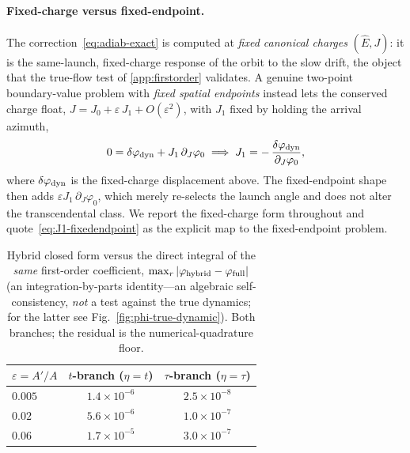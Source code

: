 \documentclass[12pt]{iopart}
\newcommand{\Ehat}{\hat E}
\begin{document}
\paragraph{Fixed-charge versus fixed-endpoint.} The correction~\eqref{eq:adiab-exact}
is computed at \emph{fixed canonical charges} $(\Ehat,J)$: it is the same-launch,
fixed-charge response of the orbit to the slow drift, the object that the true-flow
test of \ref{app:firstorder} validates. A genuine two-point boundary-value
problem with \emph{fixed spatial endpoints} instead lets the conserved charge float,
$J=J_0+\varepsilon\,J_1+O(\varepsilon^2)$, with $J_1$ fixed by holding the arrival
azimuth,
\begin{equation}
    0=\delta\varphi_{\rm dyn}+J_1\,\partial_J\varphi_0
    \;\Longrightarrow\;
    J_1=-\,\frac{\delta\varphi_{\rm dyn}}{\partial_J\varphi_0},
    \label{eq:J1-fixedendpoint}
\end{equation}
where $\delta\varphi_{\rm dyn}$ is the fixed-charge displacement above. The
fixed-endpoint shape then adds $\varepsilon J_1\,\partial_J\varphi_0$, which merely
re-selects the launch angle and does not alter the transcendental class. We report
the fixed-charge form throughout and quote~\eqref{eq:J1-fixedendpoint} as the explicit
map to the fixed-endpoint problem.

\begin{table}[htbp]
    \centering
    \caption{Hybrid closed form versus the direct integral of the \emph{same}
    first-order coefficient, $\max_r|\varphi_{\rm hybrid}-\varphi_{\rm full}|$ (an
    integration-by-parts identity---an algebraic self-consistency, \emph{not} a test
    against the true dynamics; for the latter see Fig.~\ref{fig:phi-true-dynamic}).
    Both branches; the residual is the numerical-quadrature floor.}
    \label{tab:adiab-valid}
    \begin{tabular}{lcc}
        \hline\hline
        $\varepsilon=A'/A$ & $t$-branch ($\eta=t$) & $\tau$-branch ($\eta=\tau$)\\
        \hline
        $0.005$ & $1.4\times10^{-6}$ & $2.5\times10^{-8}$\\
        $0.02$  & $5.6\times10^{-6}$ & $1.0\times10^{-7}$\\
        $0.06$  & $1.7\times10^{-5}$ & $3.0\times10^{-7}$\\
        \hline\hline
    \end{tabular}
\end{table}
\end{document}
